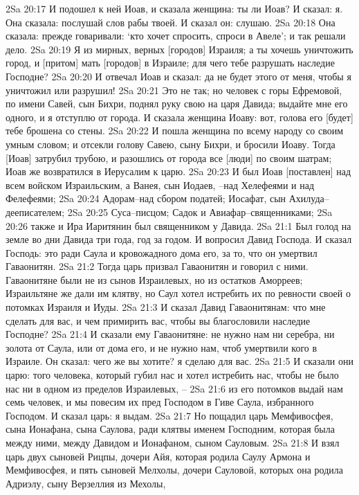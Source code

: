 2Sa 20:17  И подошел к ней Иоав, и сказала женщина: ты ли Иоав? И сказал: я. Она сказала: послушай слов рабы твоей. И сказал он: слушаю.
2Sa 20:18  Она сказала: прежде говаривали: `кто хочет спросить, спроси в Авеле'; и так решали дело.
2Sa 20:19  Я из мирных, верных [городов] Израиля; а ты хочешь уничтожить город, и [притом] мать [городов] в Израиле; для чего тебе разрушать наследие Господне?
2Sa 20:20  И отвечал Иоав и сказал: да не будет этого от меня, чтобы я уничтожил или разрушил!
2Sa 20:21  Это не так; но человек с горы Ефремовой, по имени Савей, сын Бихри, поднял руку свою на царя Давида; выдайте мне его одного, и я отступлю от города. И сказала женщина Иоаву: вот, голова его [будет] тебе брошена со стены.
2Sa 20:22  И пошла женщина по всему народу со своим умным словом; и отсекли голову Савею, сыну Бихри, и бросили Иоаву. Тогда [Иоав] затрубил трубою, и разошлись от города все [люди] по своим шатрам; Иоав же возвратился в Иерусалим к царю.
2Sa 20:23  И был Иоав [поставлен] над всем войском Израильским, а Ванея, сын Иодаев, --над Хелефеями и над Фелефеями;
2Sa 20:24  Адорам--над сбором податей; Иосафат, сын Ахилуда--дееписателем;
2Sa 20:25  Суса--писцом; Садок и Авиафар--священниками;
2Sa 20:26  также и Ира Иаритянин был священником у Давида.
2Sa 21:1  Был голод на земле во дни Давида три года, год за годом. И вопросил Давид Господа. И сказал Господь: это ради Саула и кровожадного дома его, за то, что он умертвил Гаваонитян.
2Sa 21:2  Тогда царь призвал Гаваонитян и говорил с ними. Гаваонитяне были не из сынов Израилевых, но из остатков Аморреев; Израильтяне же дали им клятву, но Саул хотел истребить их по ревности своей о потомках Израиля и Иуды.
2Sa 21:3  И сказал Давид Гаваонитянам: что мне сделать для вас, и чем примирить вас, чтобы вы благословили наследие Господне?
2Sa 21:4  И сказали ему Гаваонитяне: не нужно нам ни серебра, ни золота от Саула, или от дома его, и не нужно нам, чтоб умертвили кого в Израиле. Он сказал: чего же вы хотите? я сделаю для вас.
2Sa 21:5  И сказали они царю: того человека, который губил нас и хотел истребить нас, чтобы не было нас ни в одном из пределов Израилевых, --
2Sa 21:6  из его потомков выдай нам семь человек, и мы повесим их пред Господом в Гиве Саула, избранного Господом. И сказал царь: я выдам.
2Sa 21:7  Но пощадил царь Мемфивосфея, сына Ионафана, сына Саулова, ради клятвы именем Господним, которая была между ними, между Давидом и Ионафаном, сыном Сауловым.
2Sa 21:8  И взял царь двух сыновей Рицпы, дочери Айя, которая родила Саулу Армона и Мемфивосфея, и пять сыновей Мелхолы, дочери Сауловой, которых она родила Адриэлу, сыну Верзеллия из Мехолы,
